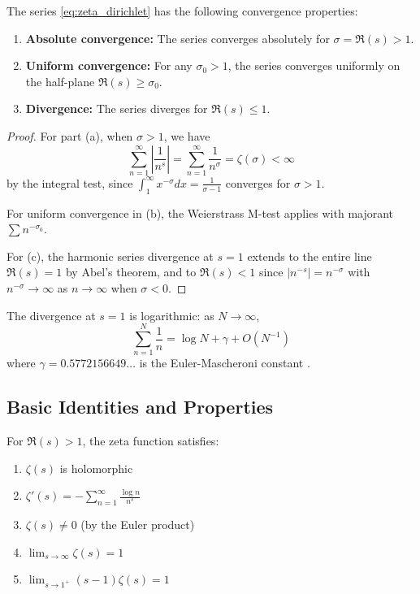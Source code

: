 \begin{theorem}
\label{thm:convergence}
The series \eqref{eq:zeta_dirichlet} has the following convergence properties:
\begin{enumerate}[label=(\alph*)]
\item \textbf{Absolute convergence:} The series converges absolutely for $\sigma = \Re(s) > 1$.
\item \textbf{Uniform convergence:} For any $\sigma_0 > 1$, the series converges uniformly on the half-plane $\Re(s) \geq \sigma_0$.
\item \textbf{Divergence:} The series diverges for $\Re(s) \leq 1$.
\end{enumerate}
\end{theorem}

\begin{proof}
For part (a), when $\sigma > 1$, we have
\[
\sum_{n=1}^{\infty} \left|\frac{1}{n^s}\right| = \sum_{n=1}^{\infty} \frac{1}{n^\sigma} = \zeta(\sigma) < \infty
\]
by the integral test, since $\int_1^{\infty} x^{-\sigma} dx = \frac{1}{\sigma-1}$ converges for $\sigma > 1$.

For uniform convergence in (b), the Weierstrass M-test applies with majorant $\sum n^{-\sigma_0}$.

For (c), the harmonic series divergence at $s = 1$ extends to the entire line $\Re(s) = 1$ by Abel's theorem, and to $\Re(s) < 1$ since $|n^{-s}| = n^{-\sigma}$ with $n^{-\sigma} \to \infty$ as $n \to \infty$ when $\sigma < 0$.
\end{proof}

\begin{remark}
The divergence at $s = 1$ is logarithmic: as $N \to \infty$, 
\[
\sum_{n=1}^N \frac{1}{n} = \log N + \gamma + O(N^{-1})
\]
where $\gamma = 0.5772156649\ldots$ is the Euler-Mascheroni constant \cite{titchmarsh1986}.
\end{remark}

\subsection{Basic Identities and Properties}

\begin{proposition}
\label{prop:basic_properties}
For $\Re(s) > 1$, the zeta function satisfies:
\begin{enumerate}[label=(\alph*)]
\item $\zeta(s)$ is holomorphic
\item $\zeta'(s) = -\sum_{n=1}^{\infty} \frac{\log n}{n^s}$
\item $\zeta(s) \neq 0$ (by the Euler product)
\item $\lim_{s \to \infty} \zeta(s) = 1$
\item $\lim_{s \to 1^+} (s-1)\zeta(s) = 1$
\end{enumerate}
\end{proposition}

